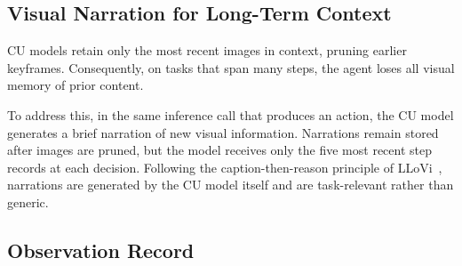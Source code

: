 \documentclass[letterpaper]{article} %
\begin{document}
\subsection{Visual Narration for Long-Term Context}
\label{sec:narration}

CU models retain only the most recent images in context, pruning earlier keyframes.
Consequently, on tasks that span many steps, the agent loses all visual memory of prior content.

To address this, in the same inference call that produces an action, the CU model generates a brief narration of new visual information. Narrations remain stored after images are pruned, but the model receives only the five most recent step records at each decision.
Following the caption-then-reason principle of LLoVi~\citep{llovi}, narrations are generated by the CU model itself and are task-relevant rather than generic.

\subsection{Observation Record}
\label{sec:obsrecord}
\end{document}
